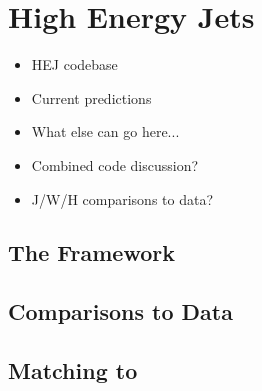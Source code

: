 \chapter{High Energy Jets}
\label{chap:HEJ}

	{\color{red}
	\begin{itemize}
		\item HEJ codebase
		\item Current predictions
		\item What else can go here...
		\item Combined code discussion?
		\item J/W/H comparisons to data?
	\end{itemize}
	}

	\section{The \HEJ Framework}

	\section{Comparisons to Data}

	\section{Matching to \ARIADNE}

